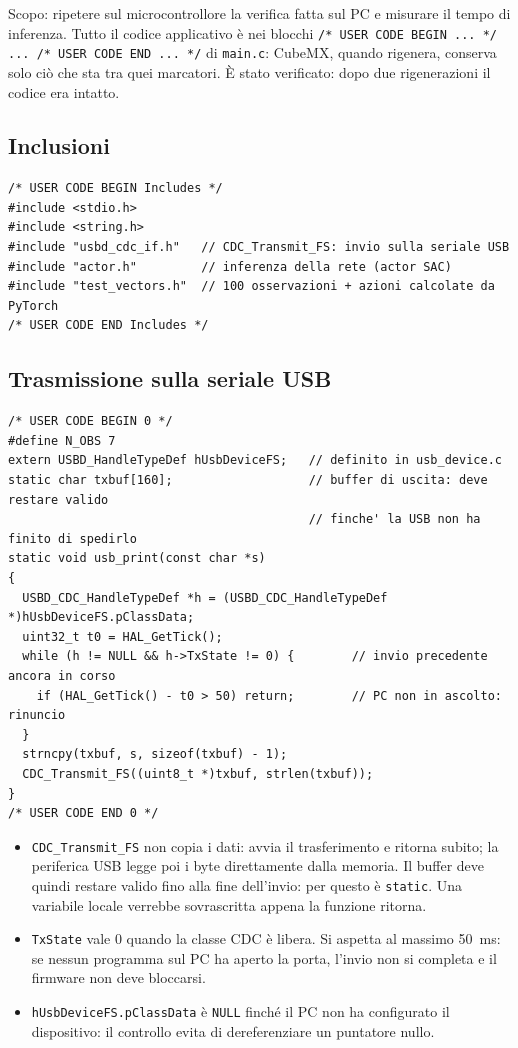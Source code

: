 \documentclass[11pt,a4paper]{article}
\newcommand{\code}[1]{\texttt{\small #1}}
\begin{document}
Scopo: ripetere sul microcontrollore la verifica fatta sul PC e misurare il tempo di inferenza.
Tutto il codice applicativo è nei blocchi \code{/* USER CODE BEGIN ... */ ... /* USER CODE END ... */}
di \code{main.c}: CubeMX, quando rigenera, conserva solo ciò che sta tra quei marcatori.
È stato verificato: dopo due rigenerazioni il codice era intatto.

\subsection{Inclusioni}
\begin{lstlisting}[style=c]
/* USER CODE BEGIN Includes */
#include <stdio.h>
#include <string.h>
#include "usbd_cdc_if.h"   // CDC_Transmit_FS: invio sulla seriale USB
#include "actor.h"         // inferenza della rete (actor SAC)
#include "test_vectors.h"  // 100 osservazioni + azioni calcolate da PyTorch
/* USER CODE END Includes */
\end{lstlisting}

\subsection{Trasmissione sulla seriale USB}
\begin{lstlisting}[style=c]
/* USER CODE BEGIN 0 */
#define N_OBS 7
extern USBD_HandleTypeDef hUsbDeviceFS;   // definito in usb_device.c
static char txbuf[160];                   // buffer di uscita: deve restare valido
                                          // finche' la USB non ha finito di spedirlo
static void usb_print(const char *s)
{
  USBD_CDC_HandleTypeDef *h = (USBD_CDC_HandleTypeDef *)hUsbDeviceFS.pClassData;
  uint32_t t0 = HAL_GetTick();
  while (h != NULL && h->TxState != 0) {        // invio precedente ancora in corso
    if (HAL_GetTick() - t0 > 50) return;        // PC non in ascolto: rinuncio
  }
  strncpy(txbuf, s, sizeof(txbuf) - 1);
  CDC_Transmit_FS((uint8_t *)txbuf, strlen(txbuf));
}
/* USER CODE END 0 */
\end{lstlisting}
\begin{itemize}
\item \code{CDC\_Transmit\_FS} non copia i dati: avvia il trasferimento e ritorna subito; la periferica
  USB legge poi i byte direttamente dalla memoria. Il buffer deve quindi restare valido fino alla fine
  dell'invio: per questo è \code{static}. Una variabile locale verrebbe sovrascritta appena la
  funzione ritorna.
\item \code{TxState} vale 0 quando la classe CDC è libera. Si aspetta al massimo 50~ms: se nessun
  programma sul PC ha aperto la porta, l'invio non si completa e il firmware non deve bloccarsi.
\item \code{hUsbDeviceFS.pClassData} è \code{NULL} finché il PC non ha configurato il dispositivo:
  il controllo evita di dereferenziare un puntatore nullo.
\end{itemize}
\end{document}
